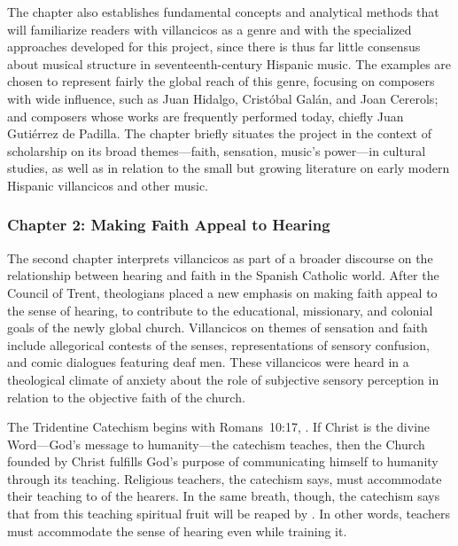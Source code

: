 \documentclass[tt]{vcbook-proposal}
\begin{document}
The chapter also establishes fundamental concepts and analytical methods that will familiarize readers with villancicos as a genre and with the specialized approaches developed for this project, since there is thus far little consensus about musical structure in seventeenth-century Hispanic music.
The examples are chosen to represent fairly the global reach of this genre, focusing on composers with wide influence, such as Juan Hidalgo, Cristóbal Galán, and Joan Cererols; and composers whose works are frequently performed today, chiefly Juan Gutiérrez de Padilla.
The chapter briefly situates the project in the context of scholarship on its broad themes---faith, sensation, music's power---in cultural studies, as well as in relation to the small but growing literature on early modern Hispanic villancicos and other music.

\subsubsection{Chapter 2: Making Faith Appeal to Hearing}

The second chapter interprets villancicos as part of a broader discourse on the relationship between hearing and faith in the Spanish Catholic world.
After the Council of Trent, theologians placed a new emphasis on making faith appeal to the sense of hearing, to contribute to the educational, missionary, and colonial goals of the newly global church.
Villancicos on themes of sensation and faith include allegorical contests of the senses, representations of sensory confusion, and comic dialogues featuring deaf men.
These villancicos were heard in a theological climate of anxiety about the role of subjective sensory perception in relation to the objective faith of the church.

The Tridentine Catechism begins with Romans~10:17, .
If Christ is the divine Word---God's message to humanity---the catechism teaches, then the Church founded by Christ fulfills God's purpose of communicating himself to humanity through its teaching.
Religious teachers, the catechism says, must accommodate their teaching to  of the hearers.
In the same breath, though, the catechism says that from this teaching spiritual fruit will be reaped by .
In other words, teachers must accommodate the sense of hearing even while training it.
\end{document}
